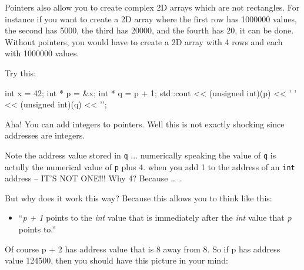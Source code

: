 Pointers also allow you to create complex 2D arrays which are not rectangles. For instance if you want to create a 2D array where the first row has 1000000 values, the second has 5000, the third has 20000, and the fourth has 20, it can be done. Without pointers, you would have to create a 2D array with 4 rows and each with 1000000 values.


\newpage{}

Try this:

\begin{consolethree}[escapeinside=||]
int x = 42;
int * p = &x;
int * q = p + 1;
std::cout << (unsigned int)(p) << ' '
          << (unsigned int)(q) << '\n';
\end{consolethree}

Aha! You can add integers to pointers. Well this is not exactly shocking
since addresses are integers.

Note the address value stored in \texttt{q} ... numerically speaking the value of \texttt{q} is actully the numerical value of \texttt{p} plus 4. when you add 1 to the address of an \texttt{int} address -- IT'S NOT ONE!!! Why 4? Because \ldots{} .

But why does it work this way? Because this allows you to think like this:

\begin{itemize}
\item ``\textit{p + 1} points to the \textit{int} value that is immediately
  after the \textit{int} value that \textit{p} points to.''
\end{itemize}

Of course p + 2 has address value that is 8 away from 8. So if p has address value 124500, then you should have this picture in your mind:

